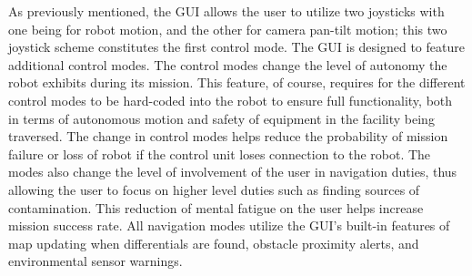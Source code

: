 As previously mentioned, the GUI allows the user to utilize two joysticks with one being for robot motion, and the other for camera pan-tilt motion; this two joystick scheme constitutes the first control mode. The GUI is designed to feature additional control modes. The control modes change the level of autonomy the robot exhibits during its mission. This feature, of course, requires for the different control modes to be hard-coded into the robot to ensure full functionality, both in terms of autonomous motion and safety of equipment in the facility being traversed. The change in control modes helps reduce the probability of mission failure or loss of robot if the control unit loses connection to the robot. The modes also change the level of involvement of the user in navigation duties, thus allowing the user to focus on higher level duties such as finding sources of contamination. This reduction of mental fatigue on the user helps increase mission success rate. All navigation modes utilize the GUI's built-in features of map updating when differentials are found, obstacle proximity alerts, and environmental sensor warnings. 


